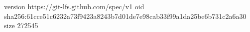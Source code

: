 version https://git-lfs.github.com/spec/v1
oid sha256:61cce51c6232a73f9423a8243b7d01de7e98cab33f99a1da25be6b731c2a6a30
size 272545
